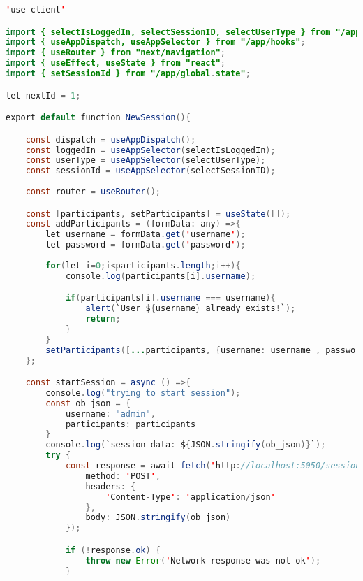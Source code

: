 \begin{lstlisting}[language=Java, caption={New Session Page}, label={lst:java}]
'use client'

import { selectIsLoggedIn, selectSessionID, selectUserType } from "/app/global.state";
import { useAppDispatch, useAppSelector } from "/app/hooks";
import { useRouter } from "next/navigation";
import { useEffect, useState } from "react";
import { setSessionId } from "/app/global.state";

let nextId = 1;

export default function NewSession(){

    const dispatch = useAppDispatch();
    const loggedIn = useAppSelector(selectIsLoggedIn);
    const userType = useAppSelector(selectUserType);
    const sessionId = useAppSelector(selectSessionID);
    
    const router = useRouter();

    const [participants, setParticipants] = useState([]);
    const addParticipants = (formData: any) =>{
        let username = formData.get('username');
        let password = formData.get('password');
        
        for(let i=0;i<participants.length;i++){
            console.log(participants[i].username);

            if(participants[i].username === username){
                alert(`User ${username} already exists!`);
                return;
            }
        }
        setParticipants([...participants, {username: username , password : password }]);
    };

    const startSession = async () =>{
        console.log("trying to start session");
        const ob_json = {
            username: "admin",
            participants: participants
        }
        console.log(`session data: ${JSON.stringify(ob_json)}`);
        try {
            const response = await fetch('http://localhost:5050/session', {
                method: 'POST',
                headers: {
                    'Content-Type': 'application/json'
                },
                body: JSON.stringify(ob_json)
            });

            if (!response.ok) {
                throw new Error('Network response was not ok');
            }


\end{lstlisting}

